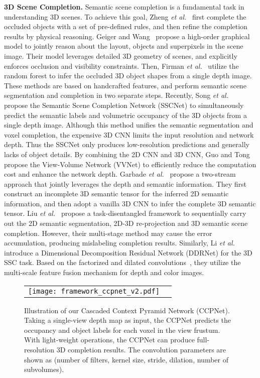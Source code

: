 \documentclass[10pt,twocolumn,letterpaper]{article}
\begin{document}
\textbf{3D Scene Completion.}
Semantic scene completion is a fundamental task in understanding 3D scenes.
To achieve this goal, Zheng \emph{et al.}~\cite{zheng2013beyond} first complete the occluded objects with a set of pre-defined rules, and then refine the completion results by physical reasoning.
Geiger and Wang~\cite{geiger2015joint} propose a high-order graphical model to jointly reason about the layout, objects and superpixels in the scene image.
Their model leverages detailed 3D geometry of scenes, and explicitly enforces occlusion and visibility constraints.
Then, Firman \emph{et al.}~\cite{firman2016structured} utilize the random forest to infer the occluded 3D object shapes from a single depth image.
These methods are based on handcrafted features, and perform semantic scene segmentation and completion in two separate steps.
Recently, Song \emph{et al.}~\cite{song2017semantic} propose the Semantic Scene Completion Network (SSCNet) to simultaneously predict the semantic labels and volumetric occupancy of the 3D objects from a single depth image.
Although this method unifies the semantic segmentation and voxel completion, the expensive 3D CNN limits the input resolution and network depth.
Thus the SSCNet only produces low-resolution predictions and generally lacks of object details.
By combining the 2D CNN and 3D CNN, Guo and Tong~\cite{guo2018view} propose the View-Volume Network (VVNet) to efficiently reduce the computation cost and enhance the network depth.
Garbade \emph{et al.}~\cite{garbade2018two} propose a two-stream approach that jointly leverages the depth and semantic information.
They first construct an incomplete 3D semantic tensor for the inferred 2D semantic information, and then adopt a vanilla 3D CNN to infer the complete 3D semantic tensor.
Liu \emph{et al.}~\cite{liu2018see} propose a task-disentangled framework to sequentially carry out the 2D semantic segmentation, 2D-3D re-projection and 3D semantic scene completion.
However, their multi-stage method may cause the error accumulation, producing mislabeling completion results.
Similarly, Li \emph{et al.}~\cite{li2019rgbd} introduce a Dimensional Decomposition Residual Network (DDRNet) for the 3D SSC task.
Based on the factorized and dilated convolutions~\cite{chen2018deeplab}, they utilize the multi-scale feature fusion mechanism for depth and color images.
\begin{figure*}
\centering
\resizebox{0.9\textwidth}{!}
{
\begin{tabular}{@{}c@{}c@{}}
\texttt{[image: framework\_ccpnet\_v2.pdf]} \\
\end{tabular}
}
\caption{Illustration of our Cascaded Context Pyramid Network (CCPNet).
Taking a single-view depth map as input, the CCPNet predicts the occupancy and object labels for each voxel in the view frustum.
With light-weight operations, the CCPNet can produce full-resolution 3D completion results.
The convolution parameters are shown as (number of filters, kernel size, stride, dilation, number of subvolumes).}
\label{fig:framework}
\vspace{-2mm}
\end{figure*}
\end{document}
